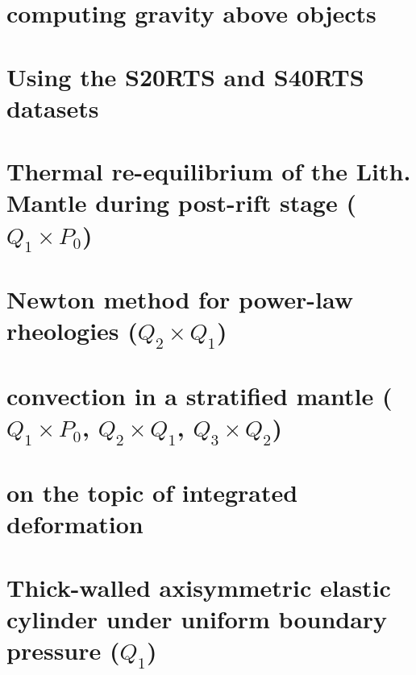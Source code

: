 \documentclass[a4paper,11pt]{report}
\begin{document}
\chapter{computing gravity above objects \label{f84}} %

\chapter{Using the S20RTS and S40RTS datasets \label{f85}} %

\chapter{Thermal re-equilibrium of the Lith. Mantle during post-rift stage ($Q_1\times P_0$)\label{f86}} %

\chapter{Newton method for power-law rheologies ($Q_2\times Q_1$) \label{f87}} %

\chapter{convection in a stratified mantle ($Q_1 \times P_0$, $Q_2\times Q_1$, $Q_3\times Q_2$) \label{f88}}%

\chapter{on the topic of integrated deformation	\label{f89}} %

\chapter{Thick-walled axisymmetric elastic cylinder under uniform boundary pressure ($Q_1$) \label{f90}} %
\end{document}

